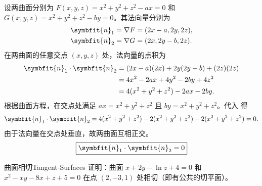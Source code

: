 \begin{myproof}
    设两曲面分别为 $F(x, y, z) = x^2 + y^2 + z^2 - ax = 0$ 和 $G(x, y, z) = x^2 + y^2 + z^2 - by = 0$。其法向量分别为
    \begin{equation}\label{eq:normals-1}
        \begin{aligned}
            \symbfit{n}_1 & = \nabla F = (2x - a, 2y, 2z), \\
            \symbfit{n}_2 & = \nabla G = (2x, 2y - b, 2z).
        \end{aligned}
    \end{equation}
    在两曲面的任意交点 $(x, y, z)$ 处，法向量的点积为
    \begin{equation}\label{eq:dot-product-1}
        \begin{aligned}
            \symbfit{n}_1 \cdot \symbfit{n}_2 & = (2x - a)(2x) + 2y(2y - b) + (2z)(2z) \\
                                              & = 4x^2 - 2ax + 4y^2 - 2by + 4z^2       \\
                                              & = 4(x^2 + y^2 + z^2) - 2ax - 2by.
        \end{aligned}
    \end{equation}
    根据曲面方程，在交点处满足 $ax = x^2 + y^2 + z^2$ 且 $by = x^2 + y^2 + z^2$。代入  得
    \begin{equation}
        \symbfit{n}_1 \cdot \symbfit{n}_2 = 4(x^2 + y^2 + z^2) - 2(x^2 + y^2 + z^2) - 2(x^2 + y^2 + z^2) = 0.
    \end{equation}
    由于法向量在交点处垂直，故两曲面互相正交。
    \begin{equation}
        \boxed{\symbfit{n}_1 \cdot \symbfit{n}_2 = 0}
    \end{equation}
\end{myproof}


\begin{problem}{曲面相切}{Tangent-Surfaces}
    证明：曲面 $x + 2y - \ln z + 4 = 0$ 和 $x^2 - xy - 8x + z + 5 = 0$ 在点 $(2, -3, 1)$ 处相切（即有公共的切平面）。
\end{problem}


